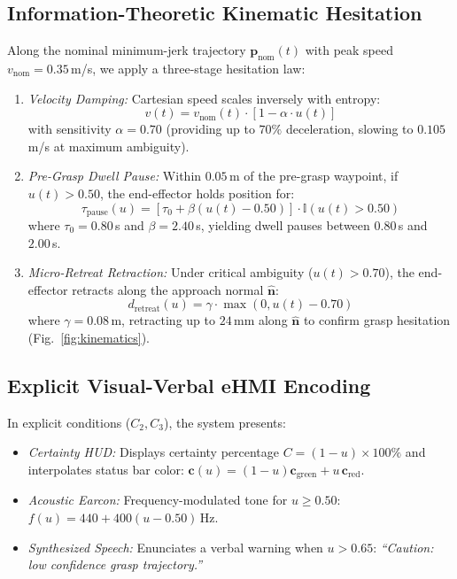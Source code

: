 \documentclass[conference]{IEEEtran}
\begin{document}
\subsection{Information-Theoretic Kinematic Hesitation}
Along the nominal minimum-jerk trajectory $\mathbf{p}_{\text{nom}}(t)$ with peak speed $v_{\text{nom}} = 0.35$\,m/s, we apply a three-stage hesitation law:
\begin{enumerate}
    \item \textit{Velocity Damping:} Cartesian speed scales inversely with entropy:
    \begin{equation}
    v(t) = v_{\text{nom}}(t) \cdot \left[1 - \alpha \cdot u(t)\right]
    \end{equation}
    with sensitivity $\alpha = 0.70$ (providing up to $70\%$ deceleration, slowing to $0.105$\,m/s at maximum ambiguity).
    \item \textit{Pre-Grasp Dwell Pause:} Within $0.05$\,m of the pre-grasp waypoint, if $u(t) > 0.50$, the end-effector holds position for:
    \begin{equation}
    \tau_{\text{pause}}(u) = \left[\tau_0 + \beta \left(u(t) - 0.50\right)\right] \cdot \mathbb{I}\left(u(t) > 0.50\right)
    \end{equation}
    where $\tau_0 = 0.80$\,s and $\beta = 2.40$\,s, yielding dwell pauses between $0.80$\,s and $2.00$\,s.
    \item \textit{Micro-Retreat Retraction:} Under critical ambiguity ($u(t) > 0.70$), the end-effector retracts along the approach normal $\hat{\mathbf{n}}$:
    \begin{equation}
    d_{\text{retreat}}(u) = \gamma \cdot \max\left(0, u(t) - 0.70\right)
    \end{equation}
    where $\gamma = 0.08$\,m, retracting up to $24$\,mm along $\hat{\mathbf{n}}$ to confirm grasp hesitation (Fig.~\ref{fig:kinematics}).
\end{enumerate}

\subsection{Explicit Visual-Verbal eHMI Encoding}
In explicit conditions ($C_2, C_3$), the system presents:
\begin{itemize}
    \item \textit{Certainty HUD:} Displays certainty percentage $C = (1 - u) \times 100\%$ and interpolates status bar color: $\mathbf{c}(u) = (1 - u)\mathbf{c}_{\text{green}} + u\,\mathbf{c}_{\text{red}}$.
    \item \textit{Acoustic Earcon:} Frequency-modulated tone for $u \ge 0.50$: $f(u) = 440 + 400(u - 0.50)$\,Hz.
    \item \textit{Synthesized Speech:} Enunciates a verbal warning when $u > 0.65$: \textit{``Caution: low confidence grasp trajectory.''}
\end{itemize}
\end{document}
